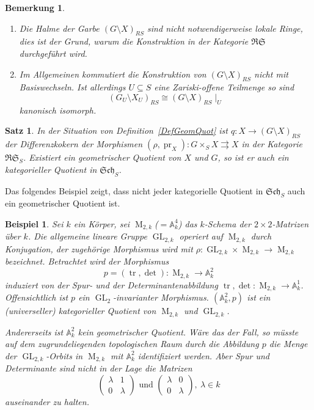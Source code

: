 \documentclass[DIV11,11pt]{scrartcl}
\theoremstyle{Definitionen}
\newtheorem{Bem}[Def]{Bemerkung}
\newtheorem{Bsp}[Def]{Beispiel}
\theoremstyle{Aussagen}
\newtheorem{Satz}[Def]{Satz}
\DeclareMathOperator{\GL}{GL}
\DeclareMathOperator{\M}{M}
\DeclareMathOperator{\pr}{pr}
\DeclareMathOperator{\tr}{tr}
\begin{document}
\begin{Bem}
\begin{enumerate}
\item Die Halme der Garbe $(G\setminus X)_{RS}$ sind nicht notwendigerweise lokale Ringe, dies ist der Grund, warum die Konstruktion in der Kategorie $\mathfrak{RS}$ durchgeführt wird.
\item Im Allgemeinen kommutiert die Konstruktion von $(G\setminus X)_{RS}$ nicht mit Basiswechseln. Ist allerdings $U\subseteq S$ eine Zariski-offene Teilmenge so sind
\begin{displaymath}
(G_U\setminus X_U)_{RS}\cong(G\setminus X)_{RS}\!\mid_U
\end{displaymath}
kanonisch isomorph.
\end{enumerate}
\end{Bem}

\begin{Satz}
In der Situation von Definition~\ref{DefGeomQuot} ist $q\colon X\rightarrow (G\setminus X)_{RS}$ der Differenzkokern der Morphismen $(\rho,\pr_X)\colon G\times_S X\rightrightarrows X$ in der Kategorie $\mathfrak{RS}_S$. Existiert ein geometrischer Quotient von $X$ und $G$, so ist er auch ein kategorieller Quotient in $\mathfrak{Sch}_S$.
\end{Satz}

Das folgendes Beispiel zeigt, dass nicht jeder kategorielle Quotient in $\mathfrak{Sch}_S$ auch ein geometrischer Quotient ist.

\begin{Bsp}
Sei $k$ ein Körper, sei $\M_{2,k}$($=\mathbb{A}^4_k$) das $k$-Schema der $2\times 2$-Matrizen über $k$. Die allgemeine lineare Gruppe $\GL_{2,k}$ operiert auf $\M_{2,k}$ durch Konjugation, der zugehörige Morphismus wird mit $\rho\colon\GL_{2,k}\times\M_{2,k}\rightarrow\M_{2,k}$ bezeichnet. Betrachtet wird der Morphismus
\begin{displaymath}
p=(\tr,\det)\colon\M_{2,k}\rightarrow\mathbb{A}^2_k
\end{displaymath}
induziert von der Spur- und der Determinantenabbildung $\tr,\det\colon\M_{2,k}\rightarrow\mathbb{A}^1_k$. Offensichtlich ist $p$ ein $\GL_2$-invarianter Morphismus. $\left(\mathbb{A}^2_k,p\right)$ ist ein (universeller) kategorieller Quotient von $\M_{2,k}$ und $\GL_{2,k}$.

Andererseits ist $\mathbb{A}^2_k$ kein geometrischer Quotient. Wäre das der Fall, so müsste auf dem zugrundeliegenden topologischen Raum durch die Abbildung $p$ die Menge der $\GL_{2,k}$-Orbits in $\M_{2,k}$ mit $\mathbb{A}^2_k$ identifiziert werden. Aber Spur und Determinante sind nicht in der Lage die Matrizen
\begin{displaymath}
\begin{pmatrix}\lambda &1\\ 0 &\lambda \end{pmatrix}
\text{ und }
\begin{pmatrix}\lambda &0\\ 0 &\lambda \end{pmatrix},~\lambda\in k
\end{displaymath}
auseinander zu halten.
\end{Bsp}
\end{document}
